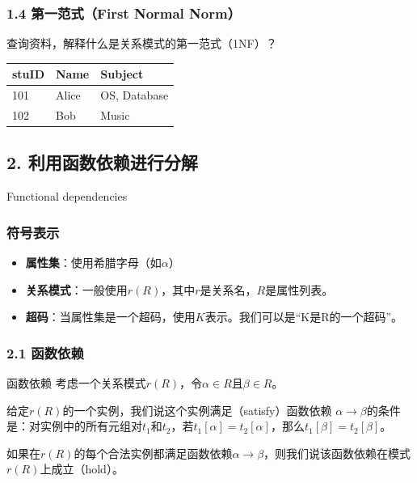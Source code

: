 \documentclass[aspectratio=169, 14pt]{beamer}
\begin{document}
\begin{frame}
    \frametitle{1.4 第一范式（First Normal Norm）}

    查询资料，解释什么是关系模式的\alert{第一范式}（1NF）？

    \begin{table}
        \begin{tabular}{lll}
          \toprule
          stuID & Name & Subject \\
          \midrule
          101 & Alice & OS, Database \\
          102 & Bob & Music \\
          \bottomrule
        \end{tabular}
    \end{table}

    
\end{frame}

\begin{frame}
    \section{\textcolor{darkmidnightblue}{2. 利用函数依赖进行分解}}
    Functional dependencies
\end{frame}

\begin{frame}
    \frametitle{符号表示}
\begin{itemize}
    \item \textbf{属性集}：使用希腊字母（如$\alpha$）
    \item \textbf{关系模式}：一般使用$r(R)$，其中$r$是关系名，$R$是属性列表。
    \item \textbf{超码}：当属性集是一个超码，使用$K$表示。我们可以是“K是R的一个超码”。
\end{itemize}

\end{frame}

\begin{frame}
    \frametitle{2.1 函数依赖}
\begin{exampleblock}{函数依赖}
考虑一个关系模式$r(R)$，令$\alpha \in R$且$\beta \in R$。   

给定$r(R)$的一个实例，我们说这个实例满足（satisfy）\alert{函数依赖} $\alpha \rightarrow \beta$的条件是：对实例中的所有元组对$t_1$和$t_2$，若$t_1[\alpha] = t_2[\alpha]$，那么$t_1[\beta] = t_2[\beta]$。
\end{exampleblock}
    
如果在$r(R)$的每个合法实例都满足函数依赖$\alpha \rightarrow \beta$，则我们说该函数依赖在模式$r(R)$上成立（hold）。
\end{frame}
\end{document}
